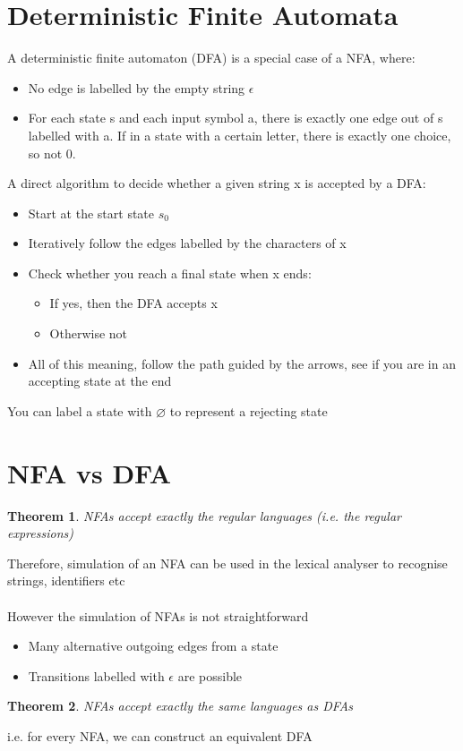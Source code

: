 \documentclass{article}[18pt]
\newtheorem{theorem}{Theorem}
\begin{document}
\section{Deterministic Finite Automata}
A deterministic finite automaton (DFA) is a special case of a NFA, where:
\begin{itemize}
	\item No edge is labelled by the empty string $\epsilon$
	\item For each state s and each input symbol a, there is exactly one edge out of s labelled with a. If in a state with a certain letter, there is exactly one choice, so not 0.
\end{itemize}
A direct algorithm to decide whether a given string x is accepted by a DFA:
\begin{itemize}
	\item Start at the start state $s_0$
	\item Iteratively follow the edges labelled by the characters of x
	\item Check whether you reach a final state when x ends:
	\begin{itemize}
		\item If yes, then the DFA accepts x
		\item Otherwise not
	\end{itemize}
	\item All of this meaning, follow the path guided by the arrows, see if you are in an accepting state at the end
\end{itemize}
You can label a state with $\varnothing$ to represent a rejecting state
\section{NFA vs DFA}
\begin{theorem}
NFAs accept exactly the regular languages (i.e. the regular expressions)
\end{theorem}

Therefore, simulation of an NFA can be used in the lexical analyser to recognise strings, identifiers etc\\
\\
However the simulation of NFAs is not straightforward
\begin{itemize}
	\item Many alternative outgoing edges from a state
	\item Transitions labelled with $\epsilon$ are possible
\end{itemize}
\begin{theorem}
	NFAs accept exactly the same languages as DFAs
\end{theorem}
i.e. for every NFA, we can construct an equivalent DFA
\end{document}
